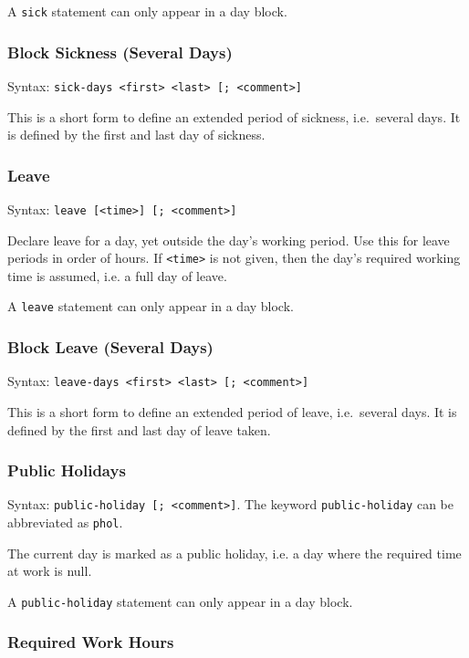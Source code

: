 \documentclass[11pt]{article}
\begin{document}
A \verb:sick: statement can only appear in a day block.

\subsubsection{Block Sickness (Several Days)}

Syntax: \verb:sick-days <first> <last> [; <comment>]:

This is a short form to define an extended period of sickness, i.e.\ several days. It is defined by the first and last day of sickness.

\subsubsection{Leave}

Syntax: \verb:leave [<time>] [; <comment>]:

Declare leave for a day, yet outside the day's working period. Use this for leave periods in order of hours. If \verb:<time>: is not given, then the day's required working time is assumed, i.e. a full day of leave.

A \verb:leave: statement can only appear in a day block.

\subsubsection{Block Leave (Several Days)}

Syntax: \verb:leave-days <first> <last> [; <comment>]:

This is a short form to define an extended period of leave, i.e.\ several days. It is defined by the first and last day of leave taken.

\subsubsection{Public Holidays}

Syntax: \verb:public-holiday [; <comment>]:.
The keyword \verb:public-holiday: can be abbreviated as \verb:phol:.

The current day is marked as a public holiday, i.e. a day where the required time at work is null.

A \verb:public-holiday: statement can only appear in a day block.

\subsubsection{Required Work Hours}
\end{document}
